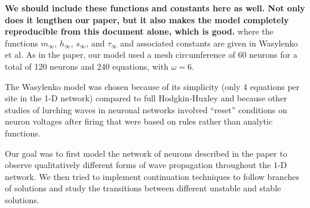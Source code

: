 \documentclass[12pt,letterpaper,oneside,openany]{article}
\begin{document}
\textbf{We should include these functions and constants here as well. Not only does it lengthen our paper, but it also makes the model completely reproducible from this document alone, which is good.}
where the functions $m_{\infty}$, $h_{\infty}$, $s_{\infty}$, and $\tau_{\infty}$ and associated constants are given in Wasylenko et al. As in the paper, our model used a mesh circumference of 60 neurons for a total of 120 neurons and 240 equations, with $\omega=6$.\cite{Wasylenko2010}

The Wasylenko model was chosen because of its simplicity (only 4 equations per site in the 1-D network) compared to full Hodgkin-Huxley \cite{Izhikevich2004} and because other studies of lurching waves in neuronal networks involved ``reset'' conditions on neuron voltages after firing that were based on rules rather than analytic functions. \cite{Golomb1999}

Our goal was to first model the network of neurons described in the paper to observe qualitatively different forms of wave propagation throughout the 1-D network. We then tried to implement continuation techniques to follow branches of solutions and study the transitions between different unstable and stable solutions.
\end{document}
